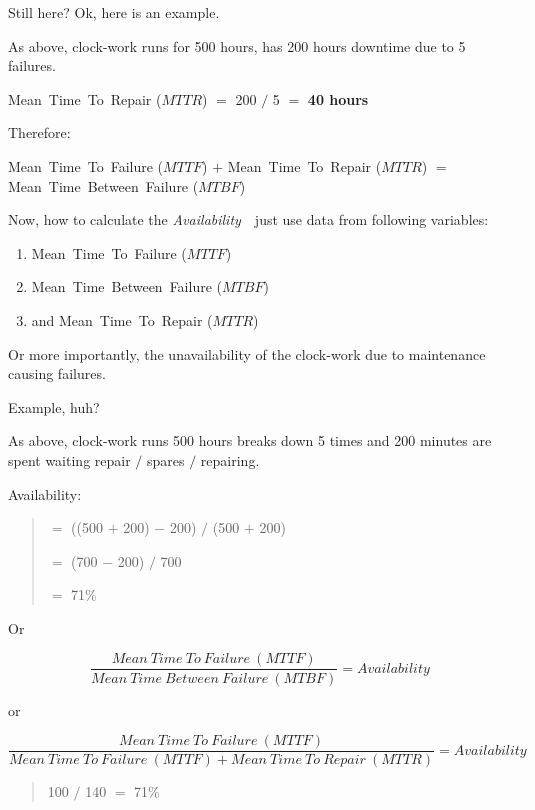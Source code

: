 Still here? Ok, here is an example.

As above, clock-work runs for 500 hours, has 200 hours downtime due to 5 failures.

Mean~Time~To~Repair ($MTTR$)  $=$  200  $/$  5  $=$  \textbf{40 hours}

Therefore: 

Mean~Time~To~Failure ($MTTF$)  $+$ Mean~Time~To~Repair ($MTTR$) $=$  Mean~Time~Between~Failure ($MTBF$)

Now, how to calculate the \emph{Availability}~\textemdash~just use data from following variables:

\begin{enumerate}

 \item Mean~Time~To~Failure ($MTTF$)
 \item Mean~Time~Between~Failure ($MTBF$)
 \item and Mean~Time~To~Repair ($MTTR$)
\end{enumerate}

Or more importantly, the unavailability of the clock-work due to maintenance causing failures.

Example, huh?

As above, clock-work runs 500 hours breaks down 5 times and 200 minutes are spent waiting repair $/$ spares $/$ repairing.

Availability:
\begin{quote}

 $=$  ((500 $+$ 200) $-$ 200) $/$ (500 $+$ 200)

 $=$  (700 $-$ 200) $/$ 700

 $=$  71\%
\end{quote}

Or

\begin{equation}\label{eq:Availability calculation}
\frac{Mean~Time~To~Failure~(MTTF)}
{Mean~Time~Between~Failure~(MTBF)} =  Availability
\end{equation}

or 


\begin{equation}\label{eq:Same Availability calculation}
\frac{Mean~Time~To~Failure~(MTTF)}
{Mean~Time~To~Failure~(MTTF)  +  Mean~Time~To~Repair~(MTTR)}  =  Availability
\end{equation}

\begin{quote}
100 $/$ 140  $=$  71\% 
\end{quote}

